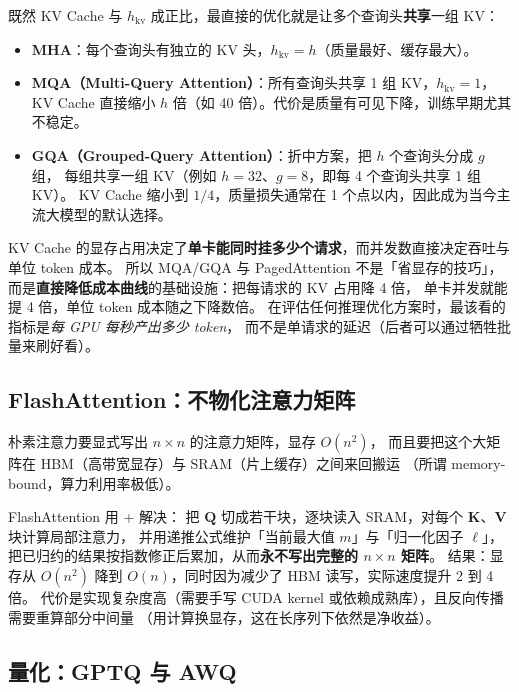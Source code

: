 既然 KV Cache 与 $h_{\text{kv}}$ 成正比，最直接的优化就是让多个查询头\textbf{共享}一组 KV：

\begin{itemize}
  \item \textbf{MHA}：每个查询头有独立的 KV 头，$h_{\text{kv}} = h$（质量最好、缓存最大）。
  \item \textbf{MQA（Multi-Query Attention）}：所有查询头共享 1 组 KV，$h_{\text{kv}} = 1$，
        KV Cache 直接缩小 $h$ 倍（如 40 倍）。代价是质量有可见下降，训练早期尤其不稳定。
  \item \textbf{GQA（Grouped-Query Attention）}：折中方案，把 $h$ 个查询头分成 $g$ 组，
        每组共享一组 KV（例如 $h = 32$、$g = 8$，即每 4 个查询头共享 1 组 KV）。
        KV Cache 缩小到 $1/4$，质量损失通常在 1 个点以内，因此成为当今主流大模型的默认选择。
\end{itemize}

\begin{insight}
KV Cache 的显存占用决定了\textbf{单卡能同时挂多少个请求}，而并发数直接决定吞吐与单位 token 成本。
所以 MQA/GQA 与 PagedAttention 不是「省显存的技巧」，
而是\textbf{直接降低成本曲线}的基础设施：把每请求的 KV 占用降 4 倍，
单卡并发就能提 4 倍，单位 token 成本随之下降数倍。
在评估任何推理优化方案时，最该看的指标是\emph{每 GPU 每秒产出多少 token}，
而不是单请求的延迟（后者可以通过牺牲批量来刷好看）。
\end{insight}

\subsection{FlashAttention：不物化注意力矩阵}

朴素注意力要显式写出 $n \times n$ 的注意力矩阵，显存 $O(n^2)$，
而且要把这个大矩阵在 HBM（高带宽显存）与 SRAM（片上缓存）之间来回搬运
（所谓 memory-bound，算力利用率极低）。

FlashAttention 用 +  解决：
把 $\bm{Q}$ 切成若干块，逐块读入 SRAM，对每个 $\bm{K}$、$\bm{V}$ 块计算局部注意力，
并用递推公式维护「当前最大值 $m$」与「归一化因子 $\ell$」，
把已归约的结果按指数修正后累加，从而\textbf{永不写出完整的 $n \times n$ 矩阵}。
结果：显存从 $O(n^2)$ 降到 $O(n)$，同时因为减少了 HBM 读写，实际速度提升 2 到 4 倍。
代价是实现复杂度高（需要手写 CUDA kernel 或依赖成熟库），且反向传播需要重算部分中间量
（用计算换显存，这在长序列下依然是净收益）。

\subsection{量化：GPTQ 与 AWQ}

